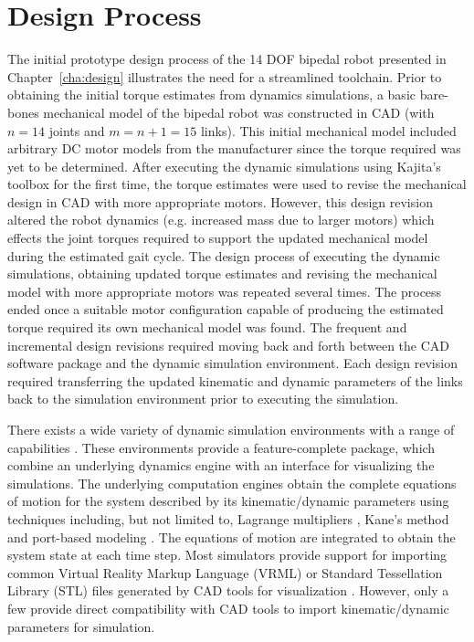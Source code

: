 \section{Design Process} %
\label{sec:design_process}

The initial prototype design process of the 14 DOF bipedal robot presented in Chapter~\ref{cha:design} illustrates the need for a streamlined toolchain. Prior to obtaining the initial torque estimates from dynamics simulations, a basic bare-bones mechanical model of the bipedal robot was constructed in CAD (with $n = 14$ joints and $m = n+1 = 15$ links). This initial mechanical model included arbitrary DC motor models from the manufacturer since the torque required was yet to be determined. After executing the dynamic simulations using Kajita's toolbox for the first time, the torque estimates were used to revise the mechanical design in CAD with more appropriate motors. However, this design revision altered the robot dynamics (e.g. increased mass due to larger motors) which effects the joint torques required to support the updated mechanical model during the estimated gait cycle. The design process of executing the dynamic simulations, obtaining updated torque estimates and revising the mechanical model with more appropriate motors was repeated several times. The process ended once a suitable motor configuration capable of producing the estimated torque required its own mechanical model was found. The frequent and incremental design revisions required moving back and forth between the CAD software package and the dynamic simulation environment. Each design revision required transferring the updated kinematic and dynamic parameters of the links back to the simulation environment prior to executing the simulation. 

There exists a wide variety of dynamic simulation environments with a range of capabilities \cite{Koenig04designand,michel2004webotstm, Kanehiro:2004dq, PonticelliCWR2006, Reichenbach2009, MedranoCerda2010}. These environments provide a feature-complete package, which combine an underlying dynamics engine with an interface for visualizing the simulations. The underlying computation engines obtain the complete equations of motion for the system described by its kinematic/dynamic parameters using techniques including, but not limited to, Lagrange multipliers \cite{Baraff1996}, Kane's method \cite{Rosenthal1986} and port-based modeling \cite{Paredis2001}. The equations of motion are integrated to obtain the system state at each time step. Most simulators provide support for importing common Virtual Reality Markup Language (VRML) or Standard Tessellation Library (STL) files generated by CAD tools for visualization \cite{Koenig04designand,michel2004webotstm}. However, only a few provide direct compatibility with CAD tools to import kinematic/dynamic parameters for simulation.

